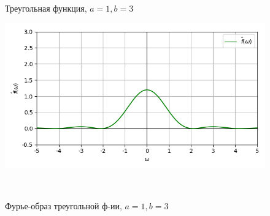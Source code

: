 \documentclass[a4paper]{article}
\begin{document}
\begin{figure}[H]
\begin{minipage}{0.5\textwidth}
        \caption{Треугольная функция, $a = 1, b = 3$}
    \end{minipage}\hfill
    \begin{minipage}{0.5\textwidth}
        \centering \includegraphics[width=\textwidth]{triangular/real_fourier_1_3.png}
        \caption{Фурье-образ треугольной ф-ии, $a = 1, b = 3$}
    \end{minipage}\\[1em]
\end{figure}\noindent\
\end{document}
